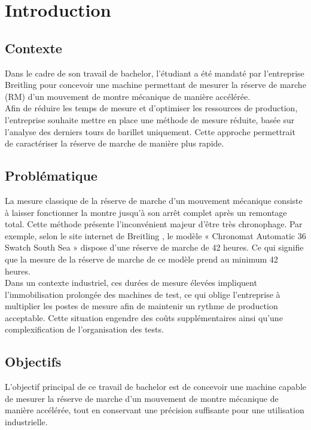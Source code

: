 \chapter{Introduction}

\section{Contexte}

Dans le cadre de son travail de bachelor, l'étudiant a été mandaté par l'entreprise Breitling pour concevoir une machine permettant de mesurer la réserve de marche (RM) d’un mouvement de montre mécanique de manière accélérée.\\ 

Afin de réduire les temps de mesure et d’optimiser les ressources de production, l’entreprise souhaite mettre en place une méthode de mesure réduite, basée sur l’analyse des derniers tours de barillet uniquement. 
Cette approche permettrait de caractériser la réserve de marche de manière plus rapide.

\section{Problématique}

La mesure classique de la réserve de marche d’un mouvement mécanique consiste à laisser fonctionner la montre jusqu’à son arrêt complet après un remontage total. Cette méthode présente l’inconvénient majeur d’être très chronophage.  
Par exemple, selon le site internet de Breitling \cite{Chronomat_South_Sea}, le modèle « Chronomat Automatic 36 Swatch South Sea » dispose d'une réserve de marche de 42 heures. Ce qui signifie que la mesure de la réserve de marche de ce modèle prend au minimum 42 heures.\\

Dans un contexte industriel, ces durées de mesure élevées impliquent l’immobilisation prolongée des machines de test, ce qui oblige l’entreprise à multiplier les postes de mesure afin de maintenir un rythme de production acceptable. 
Cette situation engendre des coûts supplémentaires ainsi qu’une complexification de l’organisation des tests.

\section{Objectifs}

L’objectif principal de ce travail de bachelor est de concevoir une machine capable de mesurer la réserve de marche d’un mouvement de montre mécanique de manière accélérée, tout en conservant une précision suffisante pour une utilisation industrielle.  

